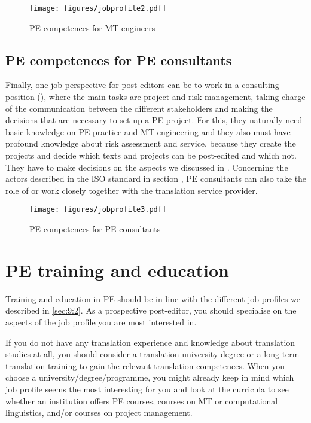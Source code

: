 \begin{figure} 
\texttt{[image: figures/jobprofile2.pdf]}
\caption{PE competences for MT engineers}
\label{fig:key:9:2:2}
\end{figure}

\subsection{PE competences for PE consultants}\label{sec:9:2:3}

Finally, one job perspective for post-editors can be to work in a consulting position (), where the main tasks are project and risk management, taking charge of the communication between the different stakeholders and making the decisions that are necessary to set up a PE project. For this, they naturally need basic knowledge on PE practice and MT engineering and they also must have profound knowledge about risk assessment and service, because they create the projects and decide which texts and projects can be post-edited and which not. They have to make decisions on the aspects we discussed in . Concerning the actors described in the ISO standard in section , PE consultants can also take the role of or work closely together with the translation service provider. 

\begin{figure} 
\texttt{[image: figures/jobprofile3.pdf]}
\caption{PE competences for PE consultants}
\label{fig:key:9:2:3}
\end{figure}

\section{PE training and education}\label{sec:9:3}
\largerpage[2]
Training and education in PE should be in line with the different job profiles we described in \ref{sec:9:2}. As a prospective post-editor, you should specialise on the aspects of the job profile you are most interested in. 

If you do not have any translation experience and knowledge about translation studies at all, you should consider a translation university degree or a long term translation training to gain the relevant translation competences. When you choose a university/degree/programme, you might already keep in mind which job profile seems the most interesting for you and look at the curricula to see whether an institution offers PE courses, courses on MT or computational linguistics, and/or courses on project management.

